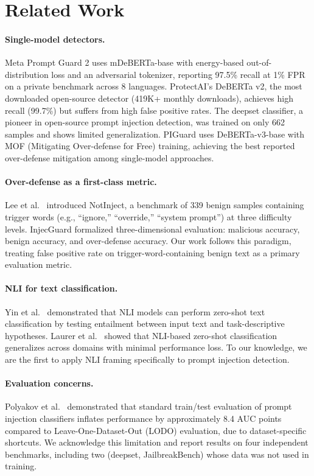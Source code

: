 \documentclass[11pt]{article}
\begin{document}
\section{Related Work}

\paragraph{Single-model detectors.} Meta Prompt Guard 2 \cite{meta2025pg2} uses mDeBERTa-base with energy-based out-of-distribution loss \cite{liu2020energy} and an adversarial tokenizer, reporting 97.5\% recall at 1\% FPR on a private benchmark across 8 languages. ProtectAI's DeBERTa v2, the most downloaded open-source detector (419K+ monthly downloads), achieves high recall (99.7\%) but suffers from high false positive rates. The deepset classifier, a pioneer in open-source prompt injection detection, was trained on only 662 samples and shows limited generalization. PIGuard \cite{lee2025injecguard} uses DeBERTa-v3-base with MOF (Mitigating Over-defense for Free) training, achieving the best reported over-defense mitigation among single-model approaches.

\paragraph{Over-defense as a first-class metric.} Lee et al.~\cite{lee2025injecguard} introduced NotInject, a benchmark of 339 benign samples containing trigger words (e.g., ``ignore,'' ``override,'' ``system prompt'') at three difficulty levels. InjecGuard formalized three-dimensional evaluation: malicious accuracy, benign accuracy, and over-defense accuracy. Our work follows this paradigm, treating false positive rate on trigger-word-containing benign text as a primary evaluation metric.

\paragraph{NLI for text classification.} Yin et al.~\cite{yin2019benchmarking} demonstrated that NLI models can perform zero-shot text classification by testing entailment between input text and task-descriptive hypotheses. Laurer et al.~\cite{laurer2023building} showed that NLI-based zero-shot classification generalizes across domains with minimal performance loss. To our knowledge, we are the first to apply NLI framing specifically to prompt injection detection.

\paragraph{Evaluation concerns.} Polyakov et al.~\cite{polyakov2026benchmarks} demonstrated that standard train/test evaluation of prompt injection classifiers inflates performance by approximately 8.4 AUC points compared to Leave-One-Dataset-Out (LODO) evaluation, due to dataset-specific shortcuts. We acknowledge this limitation and report results on four independent benchmarks, including two (deepset, JailbreakBench) whose data was not used in training.
\end{document}
